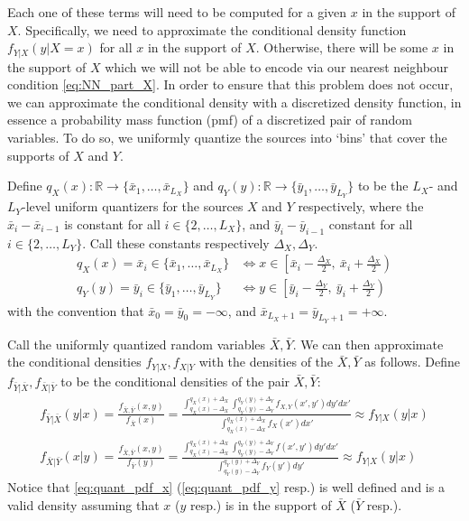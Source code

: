 Each one of these terms will need to be computed for a given $x$ in the support of $X$. Specifically, we need to approximate the conditional density function $f_{Y|X}(y|X=x)$ for all $x$ in the support of $X$. Otherwise, there will be some $x$ in the support of $X$ which we will not be able to encode via our nearest neighbour condition \eqref{eq:NN_part_X}. In order to ensure that this problem does not occur, we can approximate the conditional density with a discretized density function, in essence a probability mass function (pmf) of a discretized pair of random variables. To do so, we uniformly quantize the sources into `bins' that cover the supports of $X$ and $Y$.

Define
$q_X(x):\mathbb{R} \rightarrow \{\bar x_1,\ldots,\bar x_{L_X}\}$
and
$q_Y(y):\mathbb{R} \rightarrow \{\bar y_1,\ldots,\bar y_{L_Y}\}$
to be the $L_X$- and $L_Y$-level uniform quantizers for the sources $X$ and $Y$ respectively, where the $\bar x_i-\bar x_{i-1}$ is constant for all $i\in \{2,\ldots,L_X\}$, and $\bar y_i-\bar y_{i-1}$ constant for all $i\in \{2,\ldots,L_Y\}$. Call these constants respectively $\Delta_X, \Delta_Y$.
\begin{align}
    q_X(x) = \bar x_i \in \{\bar x_1,\ldots,\bar x_{L_X}\} &\iff x \in  \left[\bar x_{i}-\frac{\Delta_X}{2},\ \bar x_i+\frac{\Delta_X}{2}\right)\\
    q_Y(y) = \bar y_i \in \{\bar y_1,\ldots,\bar y_{L_Y}\} &\iff y \in  \left[\bar y_{i}-\frac{\Delta_Y}{2},\ \bar y_i+\frac{\Delta_Y}{2}\right)
\end{align}
with the convention that $\bar x_{0}=\bar y_{0}=-\infty$, and $\bar x_{L_X+1}=\bar y_{L_Y+1}=+\infty$.

Call the uniformly quantized random variables $\bar X, \bar Y$. We can then approximate the conditional densities $f_{Y|X}, f_{X|Y}$ with the densities of the $\bar X, \bar Y$ as follows. Define $f_{\bar Y|\bar X},f_{\bar X|\bar Y}$ to be the conditional densities of the pair $\bar X, \bar Y$:
\begin{align}
    \label{eq:quant_pdf_x}
    f_{\bar Y|\bar X}(y|x) =\frac{f_{\bar X,\bar Y}(x,y)}{f_{\bar X}(x)}=
        \frac{
            \int_{q_X(x)-\Delta_X}^{q_X(x)+\Delta_X}
            \int_{q_Y(y)-\Delta_Y}^{q_Y(y)+\Delta_Y}
                f_{X,Y}(x',y')dy'dx'
        }{
            \int_{q_X(x)-\Delta_X}^{q_X(x)+\Delta_X}f_X(x')dx'
        }\approx f_{Y|X}(y|x)\\
    \label{eq:quant_pdf_y}
    f_{\bar X|\bar Y}(x|y) =\frac{f_{\bar X,\bar Y}(x,y)}{f_{\bar Y}(y)}=
        \frac{
            \int_{q_X(x)-\Delta_X}^{q_X(x)+\Delta_X}
            \int_{q_Y(y)-\Delta_Y}^{q_Y(y)+\Delta_Y}
                f(x',y')dy'dx'
        }{
            \int_{q_Y(y)-\Delta_Y}^{q_Y(y)+\Delta_Y}f_Y(y')dy'
        }\approx f_{Y|X}(y|x)
\end{align}
Notice that \eqref{eq:quant_pdf_x} (\eqref{eq:quant_pdf_y} resp.) is well defined and is a valid density assuming that $x$ ($y$ resp.) is in the support of $\bar X$ ($\bar Y$ resp.).

